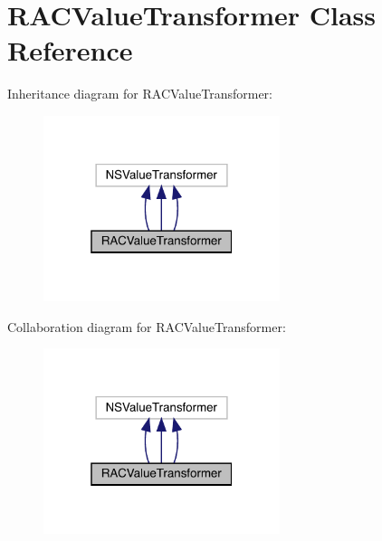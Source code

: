 \hypertarget{interface_r_a_c_value_transformer}{}\section{R\+A\+C\+Value\+Transformer Class Reference}
\label{interface_r_a_c_value_transformer}


Inheritance diagram for R\+A\+C\+Value\+Transformer\+:\nopagebreak
\begin{figure}[H]
\begin{center}
\leavevmode
\includegraphics[width=196pt]{interface_r_a_c_value_transformer__inherit__graph}
\end{center}
\end{figure}


Collaboration diagram for R\+A\+C\+Value\+Transformer\+:\nopagebreak
\begin{figure}[H]
\begin{center}
\leavevmode
\includegraphics[width=196pt]{interface_r_a_c_value_transformer__coll__graph}
\end{center}
\end{figure}
